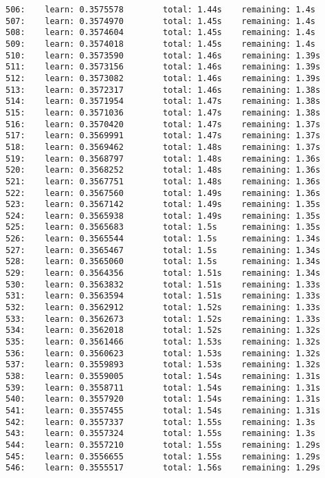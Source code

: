 \documentclass[11pt]{article}
\begin{document}
\begin{Verbatim}[commandchars=\\\{\}]
506:    learn: 0.3575578        total: 1.44s    remaining: 1.4s
507:    learn: 0.3574970        total: 1.45s    remaining: 1.4s
508:    learn: 0.3574604        total: 1.45s    remaining: 1.4s
509:    learn: 0.3574018        total: 1.45s    remaining: 1.4s
510:    learn: 0.3573590        total: 1.46s    remaining: 1.39s
511:    learn: 0.3573156        total: 1.46s    remaining: 1.39s
512:    learn: 0.3573082        total: 1.46s    remaining: 1.39s
513:    learn: 0.3572317        total: 1.46s    remaining: 1.38s
514:    learn: 0.3571954        total: 1.47s    remaining: 1.38s
515:    learn: 0.3571036        total: 1.47s    remaining: 1.38s
516:    learn: 0.3570420        total: 1.47s    remaining: 1.37s
517:    learn: 0.3569991        total: 1.47s    remaining: 1.37s
518:    learn: 0.3569462        total: 1.48s    remaining: 1.37s
519:    learn: 0.3568797        total: 1.48s    remaining: 1.36s
520:    learn: 0.3568252        total: 1.48s    remaining: 1.36s
521:    learn: 0.3567751        total: 1.48s    remaining: 1.36s
522:    learn: 0.3567560        total: 1.49s    remaining: 1.36s
523:    learn: 0.3567142        total: 1.49s    remaining: 1.35s
524:    learn: 0.3565938        total: 1.49s    remaining: 1.35s
525:    learn: 0.3565683        total: 1.5s     remaining: 1.35s
526:    learn: 0.3565544        total: 1.5s     remaining: 1.34s
527:    learn: 0.3565467        total: 1.5s     remaining: 1.34s
528:    learn: 0.3565060        total: 1.5s     remaining: 1.34s
529:    learn: 0.3564356        total: 1.51s    remaining: 1.34s
530:    learn: 0.3563832        total: 1.51s    remaining: 1.33s
531:    learn: 0.3563594        total: 1.51s    remaining: 1.33s
532:    learn: 0.3562912        total: 1.52s    remaining: 1.33s
533:    learn: 0.3562673        total: 1.52s    remaining: 1.33s
534:    learn: 0.3562018        total: 1.52s    remaining: 1.32s
535:    learn: 0.3561466        total: 1.53s    remaining: 1.32s
536:    learn: 0.3560623        total: 1.53s    remaining: 1.32s
537:    learn: 0.3559893        total: 1.53s    remaining: 1.32s
538:    learn: 0.3559005        total: 1.54s    remaining: 1.31s
539:    learn: 0.3558711        total: 1.54s    remaining: 1.31s
540:    learn: 0.3557920        total: 1.54s    remaining: 1.31s
541:    learn: 0.3557455        total: 1.54s    remaining: 1.31s
542:    learn: 0.3557337        total: 1.55s    remaining: 1.3s
543:    learn: 0.3557324        total: 1.55s    remaining: 1.3s
544:    learn: 0.3557210        total: 1.55s    remaining: 1.29s
545:    learn: 0.3556655        total: 1.55s    remaining: 1.29s
546:    learn: 0.3555517        total: 1.56s    remaining: 1.29s

\end{Verbatim}
\end{document}
